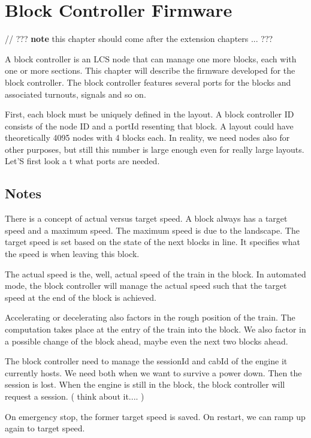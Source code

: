 \chapter{Block Controller Firmware}

// ??? \textbf{note} this chapter should come after the extension chapters ... ???

A block controller is an LCS node that can manage one more blocks, each with one or more sections. This chapter will describe the firmware developed for the block controller. The block controller features several ports for the blocks and associated turnouts, signals and so on.

First, each block must be uniquely defined in the layout. A block controller ID consists of the node ID and a portId resenting that block. A layout could have theoretically 4095 nodes with 4 blocks each. In reality, we need nodes also for other purposes, but still this number is large enough even for really large layouts. Let'S first look a t what ports are needed.


\section{Notes}

There is a concept of actual versus target speed. A block always has a target speed and a maximum speed. The maximum speed is due to the landscape. The target speed is set based on the state of the next blocks in line. It specifies what the speed is when leaving this block. 

The actual speed is the, well, actual speed of the train in the block. In automated mode, the block controller will manage the actual speed such that the target speed at the end of the block is achieved.

Accelerating or decelerating also factors in the rough position of the train. The computation takes place at the entry of the train into the block. We also factor in a possible change of the block ahead, maybe even the next two blocks ahead.

The block controller need to manage the sessionId and cabId of the engine it currently hosts. We need both when we want to survive a power down. Then the session is lost. When the engine is still in the block, the block controller will request a session. ( think about it.... )

On emergency stop, the former target speed is saved. On restart, we can ramp up again to target speed.

